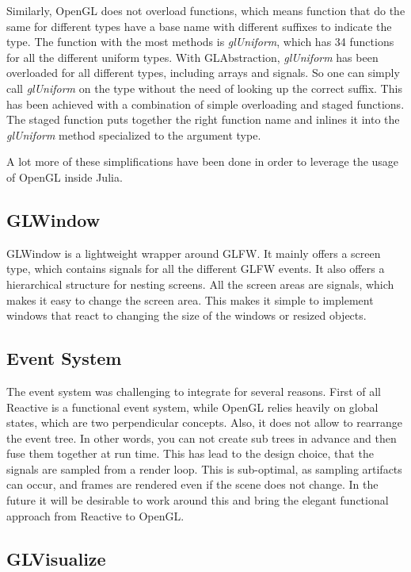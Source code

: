 Similarly, OpenGL does not overload functions, which means function that do the same for different types have a base name with different suffixes to indicate the type.
The function with the most methods is \textit{glUniform}, which has 34 functions for all the different uniform types. With GLAbstraction, \textit{glUniform} has been overloaded for all different types, including arrays and signals. So one can simply call \textit{glUniform} on the type without the need of looking up the correct suffix.
This has been achieved with a combination of simple overloading and staged functions. The staged function puts together the right function name and inlines it into the \textit{glUniform} method specialized to the argument type.

A lot more of these simplifications have been done in order to leverage the usage of OpenGL inside Julia.

\subsection{GLWindow}
GLWindow is a lightweight wrapper around GLFW.
It mainly offers a screen type, which contains signals for all the different GLFW events. 
It also offers a hierarchical structure for nesting screens.
All the screen areas are signals, which makes it easy to change the screen area. 
This makes it simple to implement windows that react to changing the size of the windows or resized objects.

\subsection{Event System}

The event system was challenging to integrate for several reasons.
First of all Reactive is a functional event system, while \ac{OpenGL} relies heavily on global states, which are two perpendicular concepts.
Also, it does not allow to rearrange the event tree. 
In other words, you can not create sub trees in advance and then fuse them together at run time.
This has lead to the design choice, that the signals are sampled from a render loop.
This is sub-optimal, as sampling artifacts can occur, and frames are rendered even if the scene does not change.
In the future it will be desirable to work around this and bring the elegant functional approach from Reactive to OpenGL.


\subsection{GLVisualize}

